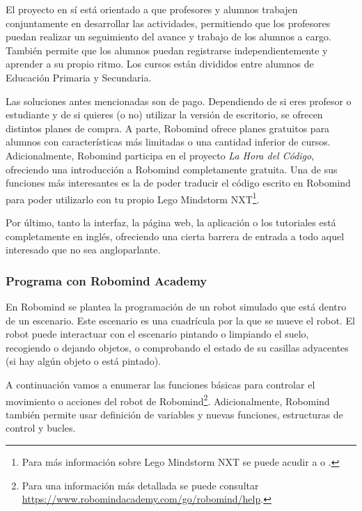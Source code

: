 El proyecto en sí está orientado a que profesores y alumnos trabajen conjuntamente en desarrollar las actividades, permitiendo que los profesores puedan realizar un seguimiento del avance y trabajo de los alumnos a cargo. También permite que los alumnos puedan registrarse independientemente y aprender a su propio ritmo. Los cursos están divididos entre alumnos de Educación Primaria y Secundaria. 

Las soluciones antes mencionadas son {\color{red}de pago}. Dependiendo de si eres profesor o estudiante y de si quieres (o no) utilizar la versión de escritorio, se ofrecen distintos planes de compra. 
A parte, Robomind ofrece planes gratuitos para alumnos con características más limitadas o una cantidad inferior de cursos. Adicionalmente, Robomind participa en el proyecto \emph{La Hora del Código}\cite{hour-of-code}, ofreciendo una introducción a Robomind completamente gratuita. Una de sus funciones más interesantes es la de poder traducir el código escrito en Robomind para poder utilizarlo con tu propio Lego Mindstorm NXT\footnote{Para más información sobre Lego Mindstorm NXT se puede acudir a \cite{lego-mindstorm} o \cite{lego-mindstorm-programar}.}.

Por último, tanto la interfaz, la página web, la aplicación o los tutoriales está completamente en inglés, ofreciendo una cierta barrera de entrada a todo aquel interesado que no sea angloparlante. 

\subsubsection{Programa con Robomind Academy}

En Robomind se plantea la programación de un robot simulado que está dentro de un escenario. Este escenario es una cuadrícula por la que se mueve el robot. El robot puede interactuar con el escenario pintando o limpiando el suelo, recogiendo o dejando objetos, o comprobando el estado de su casillas adyacentes (si hay algún objeto o está pintado).

A continuación vamos a enumerar las funciones básicas para controlar el movimiento o acciones del robot de Robomind\footnote{Para una información más detallada se puede consultar \url{https://www.robomindacademy.com/go/robomind/help}.}. Adicionalmente, Robomind también permite usar definición de variables y nuevas funciones, estructuras de control y bucles.

